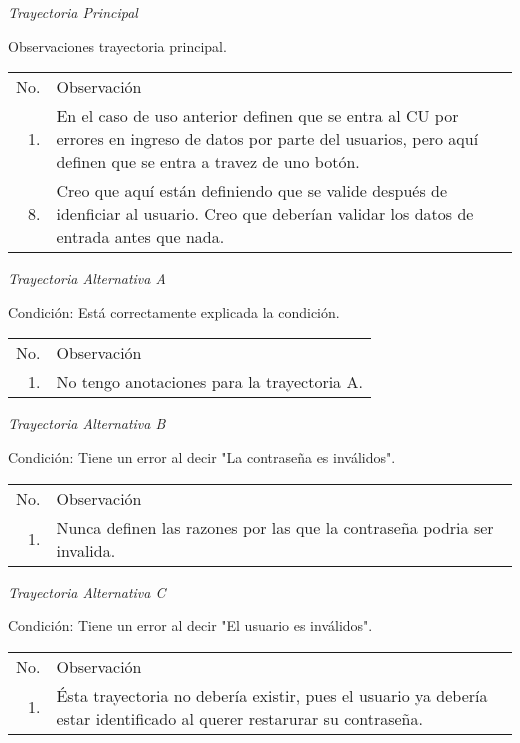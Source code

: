 \documentclass[10pt,spanish]{article}
\providecommand{\tabularnewline}{\\}
\begin{document}

\newpage

\textit{\large Trayectoria Principal}{\large {} }{\large \par}

Observaciones trayectoria principal.%
\begin{longtable}{rp{8cm}}
No.  & Observación\tabularnewline
1.  &En el caso de uso anterior definen que se entra al CU por errores en ingreso de datos por parte del usuarios, pero aquí definen que se entra a travez de uno botón.\tabularnewline
8.  &Creo que aquí están definiendo que se valide después de idenficiar al usuario. Creo que deberían validar los datos de entrada antes que nada.\tabularnewline
\end{longtable}

\textit{Trayectoria Alternativa A}

Condición: Está correctamente explicada la condición.

\begin{longtable}{rp{8cm}}
No.  & Observación\tabularnewline
1.  & No tengo anotaciones para la trayectoria A.\tabularnewline

\end{longtable}%

\textit{Trayectoria Alternativa B}

Condición: Tiene un error al decir "La contraseña  es inválidos".

\begin{longtable}{rp{8cm}}
No.  & Observación\tabularnewline
1.  & Nunca definen las razones por las que la contraseña podria ser invalida.\tabularnewline

\end{longtable}%

\textit{Trayectoria Alternativa C}

Condición: Tiene un error al decir "El usuario  es inválidos".

\begin{longtable}{rp{8cm}}
No.  & Observación\tabularnewline
1.  &Ésta trayectoria no debería existir, pues el usuario ya debería estar identificado al querer restarurar su contraseña.\tabularnewline

\end{longtable}%
\newpage{} 
\end{document}
